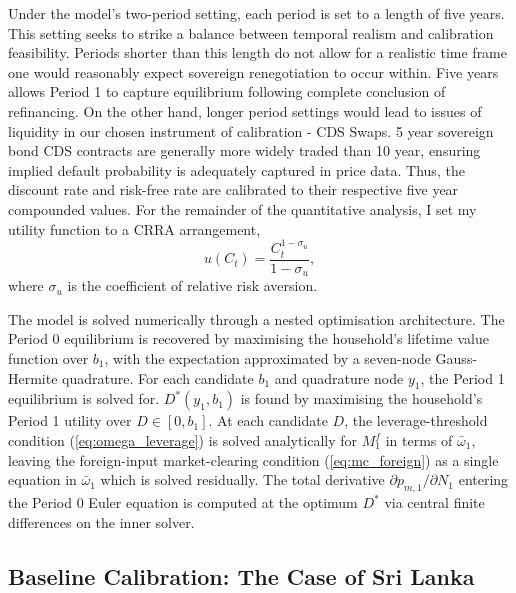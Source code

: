 \documentclass[11pt]{article}
\theoremstyle{definition}
\theoremstyle{plain}
\theoremstyle{remark}
\begin{document}
Under the model's two-period setting, each period is set to a length of five years. This setting seeks to strike a balance between temporal realism and calibration feasibility. Periods shorter than this length do not allow for a realistic time frame one would reasonably expect sovereign renegotiation to occur within. Five years allows Period 1 to capture equilibrium following complete conclusion of refinancing. On the other hand, longer period settings would lead to issues of liquidity in our chosen instrument of calibration - CDS Swaps. 5 year sovereign bond CDS contracts are generally more widely traded than 10 year, ensuring implied default probability is adequately captured in price data. Thus, the discount rate and risk-free rate are calibrated to their respective five year compounded values. For the remainder of the quantitative analysis, I set my utility function to a CRRA arrangement,
\begin{equation*}
    u(C_t)=\frac{C_t^{1-\sigma_u}}{1-\sigma_u},
\end{equation*}
where $\sigma_u$ is the coefficient of relative risk aversion.

The model is solved numerically through a nested optimisation architecture. The Period 0 equilibrium is recovered by maximising the household's lifetime value function over $b_1$, with the expectation approximated by a seven-node Gauss-Hermite quadrature. For each candidate $b_1$ and quadrature node $y_1$, the Period 1 equilibrium is solved for. $D^*(y_1, b_1)$ is found by maximising the household's Period 1 utility over $D \in [0, b_1]$. At each candidate $D$, the leverage-threshold condition (\ref{eq:omega_leverage}) is solved analytically for $M^f_1$ in terms of $\bar\omega_1$, leaving the foreign-input market-clearing condition (\ref{eq:mc_foreign}) as a single equation in $\bar\omega_1$ which is solved residually. The total derivative $\partial p_{m,1}/\partial N_1$ entering the Period 0 Euler equation is computed at the optimum $D^*$ via central finite differences on the inner solver.

\subsection{Baseline Calibration: The Case of Sri Lanka}
\end{document}
